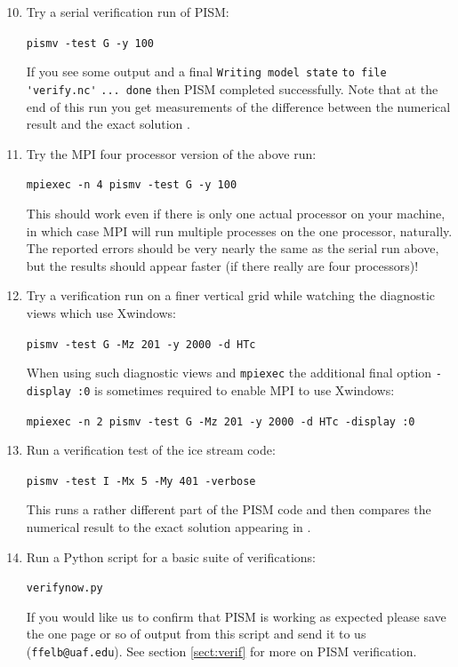 \documentclass[11pt,final]{amsart}
\begin{document}
\begin{enumerate}\setcounter{enumi}{9}
\item \label{serialpismvrun} Try a serial verification run of PISM:

\verb|pismv -test G -y 100|

\noindent If you see some output and a final \verb|Writing model state| \verb|to file 'verify.nc'| \verb|... done| then PISM completed successfully.  Note that at the end of this run you get measurements of the difference between the numerical result and the exact solution \cite{BBL}.

\item Try the MPI four processor version of the above run:

\verb|mpiexec -n 4 pismv -test G -y 100|

\noindent This should work even if there is only one actual processor on your machine, in which case MPI will run multiple processes on the one processor, naturally.  The reported errors should be very nearly the same as the serial run above, but the results should appear faster (if there really are four processors)!

\item Try a verification run on a finer vertical grid while watching the diagnostic views which use Xwindows:

\verb|pismv -test G -Mz 201 -y 2000 -d HTc|

\noindent When using such diagnostic views and \verb|mpiexec| the additional final option \verb|-display :0| is sometimes required to enable MPI to use Xwindows:

\verb|mpiexec -n 2 pismv -test G -Mz 201 -y 2000 -d HTc -display :0|

\item Run a verification test of the ice stream code:

\verb|pismv -test I -Mx 5 -My 401 -verbose|

\noindent This runs a rather different part of the PISM code and then compares the numerical result to the exact solution appearing in \cite{SchoofStream}.

\item Run a Python script for a basic suite of verifications:

\verb|verifynow.py|

\noindent If you would like us to confirm that PISM is working as expected please save the one page or so of output from this script and send it to us (\verb|ffelb@uaf.edu|).  See section \ref{sect:verif} for more on PISM verification.
\end{enumerate}
\bigskip
\end{document}
